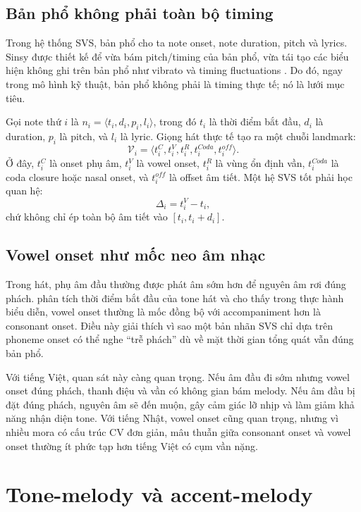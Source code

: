 \documentclass[12pt,a4paper]{article}
\newcommand{\voice}{\mathcal{V}}
\newcommand{\offset}{\Delta}
\begin{document}
\subsection{Bản phổ không phải toàn bộ timing}

Trong hệ thống SVS, bản phổ cho ta note onset, note duration, pitch và lyrics. Sinsy được thiết kế để vừa bám pitch/timing của bản phổ, vừa tái tạo các biểu hiện không ghi trên bản phổ như vibrato và timing fluctuations \parencite{hono2021sinsy}. Do đó, ngay trong mô hình kỹ thuật, bản phổ không phải là timing thực tế; nó là lưới mục tiêu.

Gọi note thứ $i$ là $n_i = \langle t_i, d_i, p_i, l_i\rangle$, trong đó $t_i$ là thời điểm bắt đầu, $d_i$ là duration, $p_i$ là pitch, và $l_i$ là lyric. Giọng hát thực tế tạo ra một chuỗi landmark:
\[
\voice_i = \langle t^{C}_i, t^{V}_i, t^{R}_i, t^{Coda}_i, t^{off}_i \rangle.
\]
Ở đây, $t^C_i$ là onset phụ âm, $t^V_i$ là vowel onset, $t^R_i$ là vùng ổn định vần, $t^{Coda}_i$ là coda closure hoặc nasal onset, và $t^{off}_i$ là offset âm tiết. Một hệ SVS tốt phải học quan hệ:
\[
\offset_i = t^{V}_i - t_i,
\]
chứ không chỉ ép toàn bộ âm tiết vào $[t_i,t_i+d_i]$.

\subsection{Vowel onset như mốc neo âm nhạc}

Trong hát, phụ âm đầu thường được phát âm sớm hơn để nguyên âm rơi đúng phách. \textcite{sundberg2007sungTone} phân tích thời điểm bắt đầu của tone hát và cho thấy trong thực hành biểu diễn, vowel onset thường là mốc đồng bộ với accompaniment hơn là consonant onset. Điều này giải thích vì sao một bản nhãn SVS chỉ dựa trên phoneme onset có thể nghe 
\enquote{trễ phách} dù về mặt thời gian tổng quát vẫn đúng bản phổ.

Với tiếng Việt, quan sát này càng quan trọng. Nếu âm đầu đi sớm nhưng vowel onset đúng phách, thanh điệu và vần có không gian bám melody. Nếu âm đầu bị đặt đúng phách, nguyên âm sẽ đến muộn, gây cảm giác lỡ nhịp và làm giảm khả năng nhận diện tone. Với tiếng Nhật, vowel onset cũng quan trọng, nhưng vì nhiều mora có cấu trúc CV đơn giản, mâu thuẫn giữa consonant onset và vowel onset thường ít phức tạp hơn tiếng Việt có cụm vần nặng.

\section{Tone-melody và accent-melody}
\end{document}

